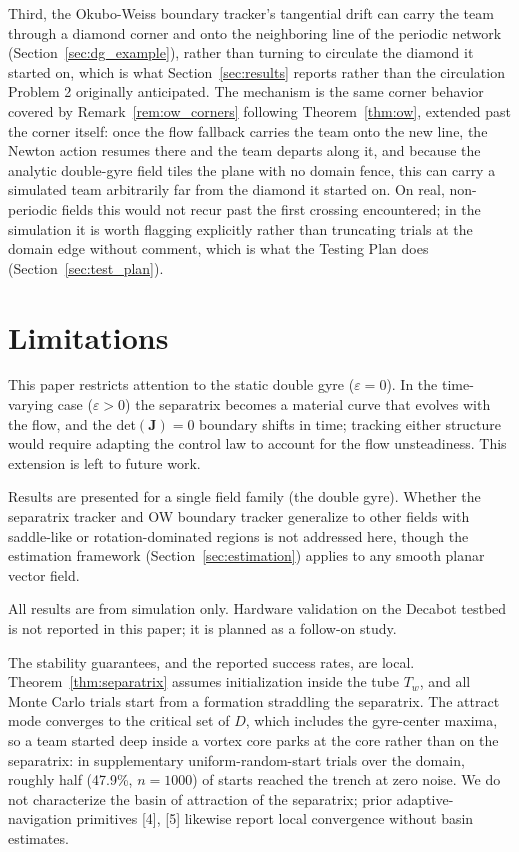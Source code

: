 \documentclass[lettersize,journal]{IEEEtran}
\begin{document}
Third, the Okubo-Weiss boundary tracker's tangential drift can carry the
team through a diamond corner and onto the neighboring line of the
periodic network (Section~\ref{sec:dg_example}), rather than turning to
circulate the diamond it started on, which is what
Section~\ref{sec:results} reports rather than the circulation Problem 2
originally anticipated. The mechanism is the same corner behavior
covered by Remark~\ref{rem:ow_corners} following Theorem~\ref{thm:ow},
extended past the corner itself: once the flow fallback carries the team
onto the new line, the Newton action resumes there and the team departs
along it, and because the analytic double-gyre field tiles the plane
with no domain fence, this can carry a simulated team arbitrarily far
from the diamond it started on. On real, non-periodic fields this
would not recur past the first crossing encountered; in the simulation
it is worth flagging explicitly rather than truncating trials at the
domain edge without comment, which is what the Testing Plan does
(Section~\ref{sec:test_plan}).


\section{Limitations}
\label{sec:limitations}

This paper restricts attention to the static double gyre ($\varepsilon = 0$).
In the time-varying case ($\varepsilon > 0$) the separatrix becomes a
material curve that evolves with the flow, and the det$(\mathbf{J}) = 0$
boundary shifts in time; tracking either structure would require adapting
the control law to account for the flow unsteadiness. This extension is
left to future work.

Results are presented for a single field family (the double gyre). Whether
the separatrix tracker and OW boundary tracker generalize to other fields
with saddle-like or rotation-dominated regions is not addressed here,
though the estimation framework (Section~\ref{sec:estimation}) applies
to any smooth planar vector field.

All results are from simulation only. Hardware validation on the Decabot
testbed is not reported in this paper; it is planned as a follow-on study.

The stability guarantees, and the reported success rates, are local.
Theorem~\ref{thm:separatrix} assumes initialization inside the tube
$T_w$, and all Monte Carlo trials start from a formation straddling the
separatrix. The attract mode converges to the critical set of $D$, which
includes the gyre-center maxima, so a team started deep inside a vortex
core parks at the core rather than on the separatrix: in supplementary
uniform-random-start trials over the domain, roughly half (47.9\%,
$n = 1000$) of starts reached the trench at zero noise. We do not
characterize the basin of attraction of the separatrix; prior
adaptive-navigation primitives [4], [5] likewise report local
convergence without basin estimates.
\end{document}
